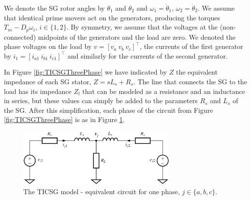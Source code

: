 \documentclass{ifacconf}
\renewcommand{\o}    {{\omega}}
\begin{document}
We denote the SG rotor angles by $\theta_1$ and $\theta_2$ and
$\o_1=\dot\theta_1$, $\o_2=\dot\theta_2$. We assume that identical
prime movers act on the generators, producing the torques
$T_{m}-D_p\o_i$, $i\in\{1,2\}$. By symmetry, we assume that the
voltages at the (non-connected) midpoints of the generators and the
load are zero. We denoted the phase voltages on the load by
$v=\left[v_a\ v_b\ v_c \right]^\top$, the currents of the first
generator by $i_1=\left[i_{a1} \ i_{b1}\ i_{c1}\right]^\top$ and 
similarly for the currents of the second generator.

In Figure \ref{fig:TICSGThreePhase} we have indicated by $Z$ the
equivalent impedance of each SG stator, $Z=sL_s+R_s$. The line that
connects the SG to the load has its impedance $Z_l$ that can be
modeled as a resistance and an inductance in series, but these values
can simply be added to the parameters $R_s$ and $L_s$ of the SG. After
this simplification, each phase of the circuit from Figure
\ref{fig:TICSGThreePhase} is as in Figure \ref{fig:TICSGOnePhase}.

\begin{figure} %
\centering \includegraphics[width=8cm]{one_phase.eps}
\vspace{-3mm}
\caption{The TICSG model - equivalent circuit for one phase, 
$j\in\{a,b,c\}.$} \label{fig:TICSGOnePhase}
\end{figure}
\end{document}
